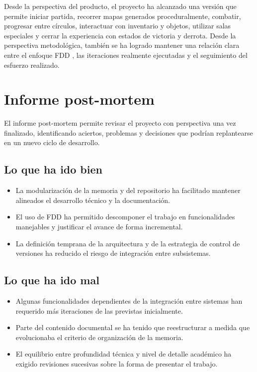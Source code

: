 Desde la perspectiva del producto, el proyecto ha alcanzado una versión que permite iniciar
partida, recorrer mapas generados proceduralmente, combatir, progresar entre círculos,
interactuar con inventario y objetos, utilizar salas especiales y cerrar la experiencia con
estados de victoria y derrota. Desde la perspectiva metodológica, también se ha logrado
mantener una relación clara entre el enfoque FDD \cite{palmer2002fdd}, las iteraciones
realmente ejecutadas y el seguimiento del esfuerzo realizado.

\section{Informe post-mortem}
El informe post-mortem permite revisar el proyecto con perspectiva una vez finalizado,
identificando aciertos, problemas y decisiones que podrían replantearse en un nuevo ciclo
de desarrollo.

\subsection{Lo que ha ido bien}
\begin{itemize}
    \item La modularización de la memoria y del repositorio ha facilitado mantener alineados el desarrollo técnico y la documentación.
    \item El uso de FDD \cite{palmer2002fdd} ha permitido descomponer el trabajo en funcionalidades manejables y justificar el avance de forma incremental.
    \item La definición temprana de la arquitectura y de la estrategia de control de versiones ha reducido el riesgo de integración entre subsistemas.
\end{itemize}

\subsection{Lo que ha ido mal}
\begin{itemize}
    \item Algunas funcionalidades dependientes de la integración entre sistemas han requerido más iteraciones de las previstas inicialmente.
    \item Parte del contenido documental se ha tenido que reestructurar a medida que evolucionaba el criterio de organización de la memoria.
    \item El equilibrio entre profundidad técnica y nivel de detalle académico ha exigido revisiones sucesivas sobre la forma de presentar el trabajo.
\end{itemize}

